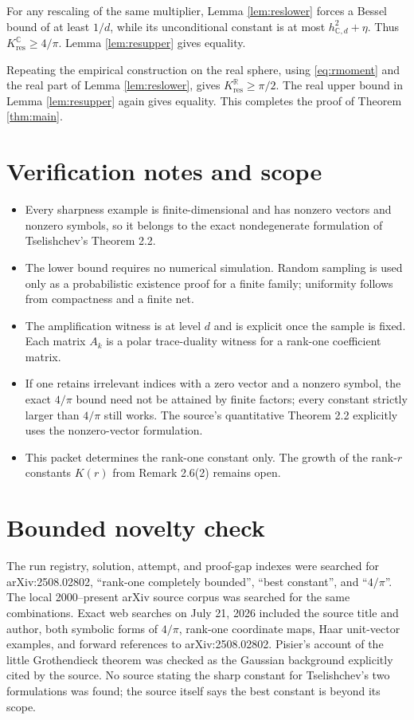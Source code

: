\documentclass[11pt]{article}
\newcommand{\C}{\mathbb C}
\newcommand{\R}{\mathbb R}
\begin{document}
For any rescaling of the same multiplier, Lemma \ref{lem:reslower} forces a
Bessel bound of at least $1/d$, while its unconditional constant is at most
$h_{\C,d}^2+\eta$.  Thus
$K_{\mathrm{res}}^{\C}\geq4/\pi$.  Lemma \ref{lem:resupper} gives equality.

Repeating the empirical construction on the real sphere, using
\eqref{eq:rmoment} and the real part of Lemma \ref{lem:reslower}, gives
$K_{\mathrm{res}}^{\R}\geq\pi/2$.  The real upper bound in Lemma
\ref{lem:resupper} again gives equality.  This completes the proof of
Theorem \ref{thm:main}.

\section*{Verification notes and scope}

\begin{itemize}
\item Every sharpness example is finite-dimensional and has nonzero vectors
and nonzero symbols, so it belongs to the exact nondegenerate formulation of
Tselishchev's Theorem 2.2.
\item The lower bound requires no numerical simulation.  Random sampling is
used only as a probabilistic existence proof for a finite family; uniformity
follows from compactness and a finite net.
\item The amplification witness is at level $d$ and is explicit once the
sample is fixed.  Each matrix $A_k$ is a polar trace-duality witness for a
rank-one coefficient matrix.
\item If one retains irrelevant indices with a zero vector and a nonzero
symbol, the exact $4/\pi$ bound need not be attained by finite factors; every
constant strictly larger than $4/\pi$ still works.  The source's quantitative
Theorem 2.2 explicitly uses the nonzero-vector formulation.
\item This packet determines the rank-one constant only.  The growth of the
rank-$r$ constants $K(r)$ from Remark 2.6(2) remains open.
\end{itemize}

\section*{Bounded novelty check}

The run registry, solution, attempt, and proof-gap indexes were searched for
arXiv:2508.02802, ``rank-one completely bounded'', ``best constant'', and
``$4/\pi$''.  The local 2000--present arXiv source corpus was searched for the
same combinations.  Exact web searches on July 21, 2026 included the source
title and author, both symbolic forms of $4/\pi$, rank-one coordinate maps,
Haar unit-vector examples, and forward references to arXiv:2508.02802.
Pisier's account of the little Grothendieck theorem \cite[Section 5]{Pisier}
was checked as the Gaussian background explicitly cited by the source.  No
source stating the sharp constant for Tselishchev's two formulations was
found; the source itself says the best constant is beyond its scope.
\end{document}
